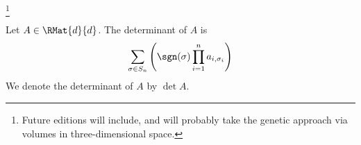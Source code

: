 
\footnote{Future editions will include, and will probably take the genetic approach via volumes in three-dimensional space.}


Let $A \in \RMat{d}{d}$.
The determinant of $A$ is
\[
  \sum_{\sigma \in S_n} \left( \sgn(\sigma) \prod_{i = 1}^{n} a_{i,\sigma_{i}} \right)
\]
We denote the determinant of $A$ by $\det A$.

\blankpage
